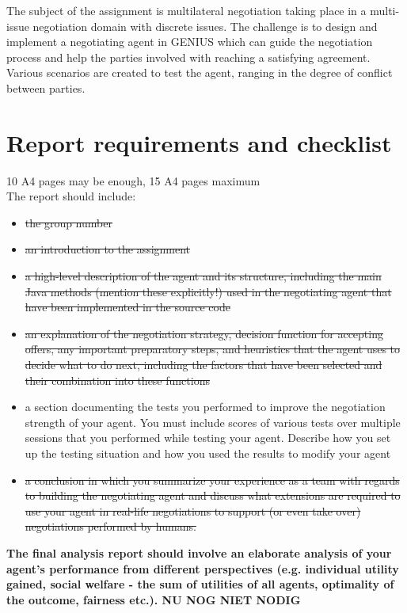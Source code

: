 \documentclass[11pt,a4paper]{article}
\begin{document}
The subject of the assignment is multilateral negotiation taking place in a multi-issue negotiation domain with discrete issues. The challenge is to design and implement a negotiating agent in GENIUS which can guide the negotiation process and help the parties involved with reaching a satisfying agreement. Various scenarios are created to test the agent, ranging in the degree of conflict between parties.\\



\newpage



\newpage



\newpage



\newpage



\newpage

\section*{Report requirements and checklist}

10 A4 pages may be enough, 15 A4 pages maximum\\
The report should include:\\
\begin{itemize}
\item \st{the group number}
\item \st{an introduction to the assignment}
\item \st{a high-level description of the agent and its structure, including the main Java methods (mention
these explicitly!) used in the negotiating agent that have been implemented in the source code}
\item \st{an explanation of the negotiation strategy, decision function for accepting offers, any important
preparatory steps, and heuristics that the agent uses to decide what to do next, including the factors
that have been selected and their combination into these functions}
\item a section documenting the tests you performed to improve the negotiation strength of your agent.
You must include scores of various tests over multiple sessions that you performed while testing
your agent. Describe how you set up the testing situation and how you used the results to modify
your agent
\item \st{a conclusion in which you summarize your experience as a team with regards to building the
negotiating agent and discuss what extensions are required to use your agent in real-life negotiations
to support (or even take over) negotiations performed by humans.}
\end{itemize}

\textbf{The final analysis report should involve an elaborate analysis of your agent's performance from different perspectives (e.g. individual utility gained, social welfare - the sum of utilities of all agents, optimality of the outcome, fairness etc.). NU NOG NIET NODIG}
\end{document}
